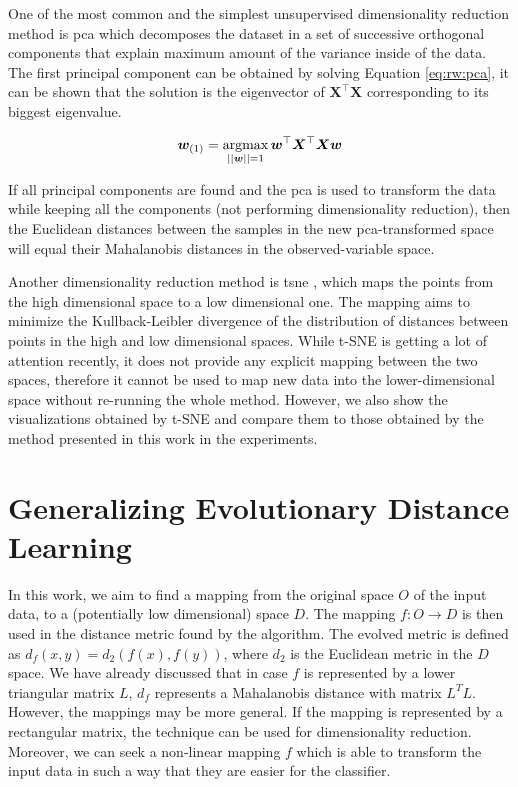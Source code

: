 \documentclass[12pt,a4paper]{report}
\begin{document}
One of the most common and the simplest unsupervised dimensionality reduction method is \ac{pca} \citep{jolliffe2002principal} which decomposes the dataset in a set of successive orthogonal components that explain maximum amount of the variance inside of the data. The first principal component can be obtained by solving Equation \ref{eq:rw:pca}, it can be shown that the solution is the eigenvector of $\bm{X}^\top\bm{X}$ corresponding to its biggest eigenvalue.

\begin{equation} 
\bm{w}_{(1)} = \operatorname*{argmax}_{||\bm{w}||=1} \bm{w}^\top\bm{X}^\top\bm{X}\bm{w} \label{eq:rw:pca}
\end{equation}

If all principal components are found and the \ac{pca} is used to transform the data while keeping all the components (not performing dimensionality reduction), then the Euclidean distances between the samples in the new \ac{pca}-transformed space will equal their Mahalanobis distances in the observed-variable space.

Another dimensionality reduction method is \ac{tsne} \citep{maaten2008visualizing}, which maps the points from the high dimensional space to a low dimensional one. The mapping aims to minimize the Kullback-Leibler divergence of the distribution of distances between points in the high and low dimensional spaces. While t-SNE is getting a lot of attention recently, it does not provide any explicit mapping between the two spaces, therefore it cannot be used to map new data into the lower-dimensional space without re-running the whole method. However, we also show the visualizations obtained by t-SNE and compare them to those obtained by the method presented in this work in the experiments.


\chapter{Generalizing Evolutionary Distance Learning} \label{chap:our-method}

In this work, we aim to find a mapping from the original space $O$ of the input data, to a (potentially low dimensional) space $D$. The mapping $f: O \to D$ is then used in the distance metric found by the algorithm. The evolved metric is defined as $d_f(x, y) = d_2(f(x), f(y))$, where $d_2$ is the Euclidean metric in the $D$ space. We have already discussed that in case $f$ is represented by a lower triangular matrix $L$, $d_f$ represents a Mahalanobis distance with matrix $L^TL$. However, the mappings may be more general. If the mapping is represented by a rectangular matrix, the technique can be used for dimensionality reduction. Moreover, we can seek a non-linear mapping $f$ which is able to transform the input data in such a way that they are easier for the classifier.
\end{document}
